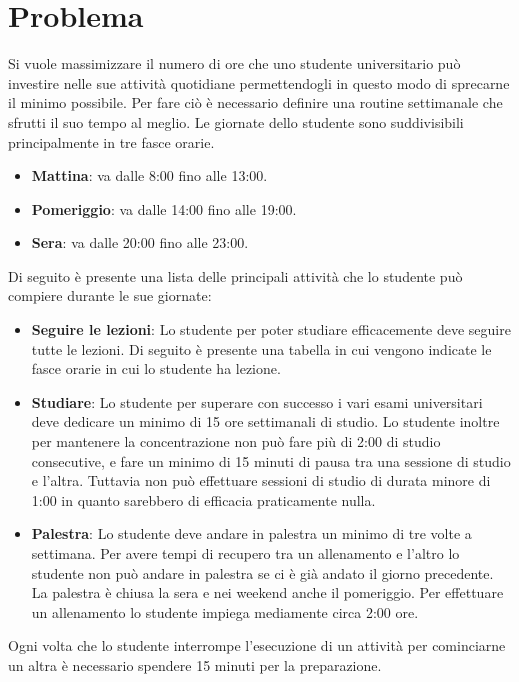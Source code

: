 \documentclass[12pt]{article}
\begin{document}
	

	\newpage
	
	\tableofcontents
	
	\newpage
	
	\section{Problema}
	Si vuole massimizzare il numero di ore che uno studente universitario può investire nelle sue attività quotidiane permettendogli in questo modo di sprecarne il minimo possibile. Per fare ciò è necessario definire una routine settimanale che sfrutti il suo tempo al meglio.
	Le giornate dello studente sono suddivisibili principalmente in tre fasce orarie.
	\begin{itemize}
		\item {\textbf{Mattina}: va dalle 8:00 fino alle 13:00.}
		\item{\textbf{Pomeriggio}: va dalle 14:00 fino alle 19:00.}
		\item{\textbf{Sera}: va dalle 20:00 fino alle 23:00.}		
	\end{itemize}
	Di seguito è presente una lista delle principali attività che lo studente può compiere durante le sue giornate:
	\begin{itemize}
		\item \textbf{Seguire le lezioni}: Lo studente per poter studiare efficacemente deve seguire tutte le lezioni. Di seguito è presente una tabella in cui vengono indicate le fasce orarie in cui lo studente ha lezione.
		\item \textbf{Studiare}: Lo studente per superare con successo i vari esami universitari deve dedicare un minimo di 15 ore settimanali di studio. Lo studente inoltre per mantenere la concentrazione non può fare più di 2:00 di studio consecutive, e fare un minimo di 15 minuti di pausa tra una sessione di studio e l'altra. Tuttavia non può effettuare sessioni di studio di durata minore di 1:00 in quanto sarebbero di efficacia praticamente nulla.
		\item \textbf{Palestra}: Lo studente deve andare in palestra un minimo di tre volte a settimana. Per avere tempi di recupero tra un allenamento e l'altro lo studente non può andare in palestra se ci è già andato il giorno precedente. La palestra è chiusa la sera e nei weekend anche il pomeriggio. Per effettuare un allenamento lo studente impiega mediamente circa 2:00 ore.

	\end{itemize}
	Ogni volta che lo studente interrompe l'esecuzione di un attività per cominciarne un altra  è necessario spendere 15 minuti per la preparazione.
\end{document}
